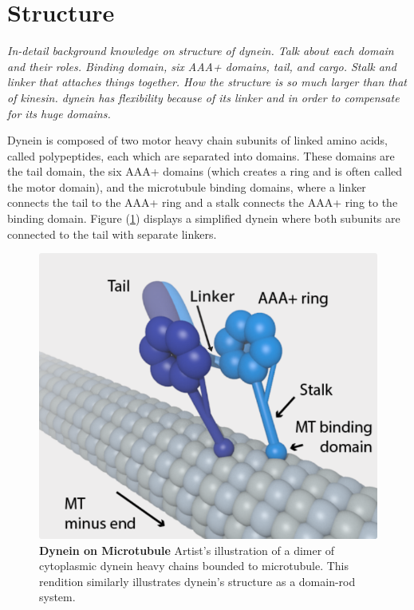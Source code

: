 \section{Structure}
\textit{In-detail background knowledge on structure of dynein. Talk about each domain and their roles. Binding domain, six AAA+ domains, tail, and cargo. Stalk and linker that attaches things together. How the structure is so much larger than that of kinesin. dynein has flexibility because of its linker and in order to compensate for its huge domains. }

Dynein is composed of two motor heavy chain subunits of linked amino acids, called polypeptides, each which are separated into domains. These domains are the tail domain, the six AAA+ domains (which creates a ring and is often called the motor domain), and the microtubule binding domains, where a linker connects the tail to the AAA+ ring and a stalk connects the AAA+ ring to the binding domain. Figure (\ref{fig:structure}) displays a simplified dynein where both subunits are connected to the tail with separate linkers. 


\begin{figure}[H]
	\centering
	\includegraphics[width=0.6\columnwidth]{Figures/dynein_on_MT.png}
	\caption[Dynein on Microtubule]{\textbf{Dynein on Microtubule} Artist’s illustration of a dimer of cytoplasmic dynein heavy chains bounded to microtubule. This rendition similarly illustrates dynein’s structure as a domain-rod system. \cite{TheTrappistArt}}
	\label{fig:structure}
\end{figure}

